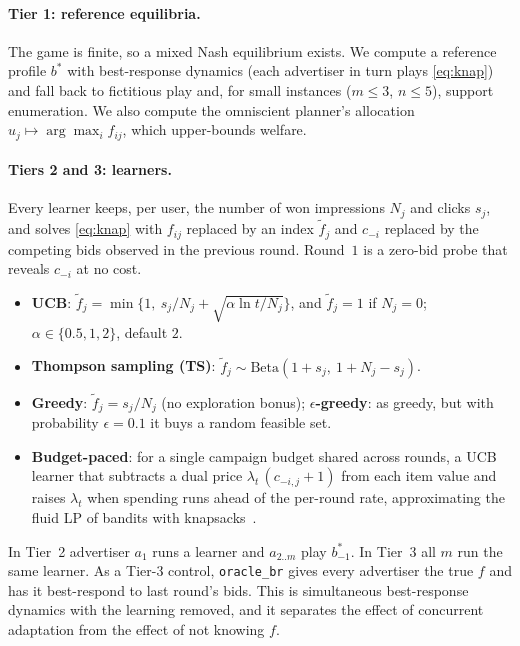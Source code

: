 \documentclass[11pt]{article}
\theoremstyle{remark}
\begin{document}
\paragraph{Tier 1: reference equilibria.} The game is finite, so a mixed Nash equilibrium exists. We
compute a reference profile $b^*$ with best-response dynamics (each advertiser in turn plays
\eqref{eq:knap}) and fall back to fictitious play and, for small instances ($m\le3$, $n\le5$), support
enumeration. We also compute the omniscient planner's allocation $u_j\mapsto\arg\max_i f_{ij}$, which
upper-bounds welfare.

\paragraph{Tiers 2 and 3: learners.} Every learner keeps, per user, the number of won impressions
$N_j$ and clicks $s_j$, and solves \eqref{eq:knap} with $f_{ij}$ replaced by an index $\tilde f_j$
and $c_{-i}$ replaced by the competing bids observed in the previous round. Round~$1$ is a zero-bid probe
that reveals $c_{-i}$ at no cost.
\begin{itemize}
  \item \textbf{UCB}: $\tilde f_j=\min\{1,\ s_j/N_j+\sqrt{\alpha\ln t/N_j}\}$, and $\tilde f_j=1$ if
        $N_j=0$; $\alpha\in\{0.5,1,2\}$, default $2$.
  \item \textbf{Thompson sampling (TS)}: $\tilde f_j\sim\mathrm{Beta}(1+s_j,\ 1+N_j-s_j)$.
  \item \textbf{Greedy}: $\tilde f_j=s_j/N_j$ (no exploration bonus); \textbf{$\epsilon$-greedy}: as
        greedy, but with probability $\epsilon=0.1$ it buys a random feasible set.
  \item \textbf{Budget-paced}: for a single campaign budget shared across rounds, a UCB learner that
        subtracts a dual price $\lambda_t\,(c_{-i,j}+1)$ from each item value and raises $\lambda_t$ when
        spending runs ahead of the per-round rate, approximating the fluid LP of bandits with
        knapsacks~\citep{badanidiyuru2013bandits,agrawal2014bandits}.
\end{itemize}
In Tier~2 advertiser $a_1$ runs a learner and $a_{2..m}$ play $b^*_{-1}$. In Tier~3 all $m$ run the
same learner. As a Tier-3 control, \texttt{oracle\_br} gives every advertiser the true $f$ and has it
best-respond to last round's bids. This is simultaneous best-response dynamics with the learning removed,
and it separates the effect of concurrent adaptation from the effect of not knowing $f$.
\end{document}
